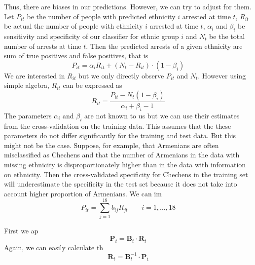 Thus, there are biases in our predictions. However, we can try to adjust for them. Let $P_{it}$ be the number of people with predicted ethnicity $i$ arrested at time $t$, $R_{it}$ be actual the number of people with ethnicity $i$ arrested at time $t$, $\alpha_i$ and $\beta_i$  be sensitivity and specificity of our classifier for ethnic group $i$ and $N_t$ be the total number of arrests at time $t$. Then the predicted arrests of a given ethnicity are sum of true positives and false positives, that is
\begin{equation*}
    P_{it} = \alpha_i R_{it} + \left( N_t - R_{it} \right) \cdot \left(1 - \beta_i \right)  
\end{equation*}
We are interested in $R_{it}$ but we only directly observe $P_{it}$ and $N_t$. However using simple algebra, $R_{it}$ can be expressed as
\begin{equation*}
 R_{it} = \frac{P_{it} - N_t  \left(1 - \beta_i \right)}{\alpha_i + \beta_i - 1}
\end{equation*}
The parameters $\alpha_i$ and $\beta_i$ are not known to us but we can use their estimates from the cross-validation on the training data. This assumes that the these parameters do not differ significantly for the training and test data. But this might not be the case. 
Suppose, for example, that Armenians are often misclassified as Chechens and that the number of Armenians in the data with missing ethnicity  is disproportionately higher than in the data with information on ethnicity. 
Then the cross-validated specificity for Chechens in the training set will underestimate the specificity in the test set because it does not take into account higher proportion of Armenians. 
We can im
\begin{equation*}
P_{it}  = \sum_{j = 1}^{18} b_{ij} R_{jt} \qquad i = 1, \dots, 18
\end{equation*}

First we ap
\begin{equation*}
 \mathbf{P}_t = \mathbf{B}_t \cdot \mathbf{R}_t 
\end{equation*}
Again, we can easily calculate th
\begin{equation*}
\mathbf{R}_t  = \mathbf{B}_t^{-1} \cdot  \mathbf{P}_t
\end{equation*}



